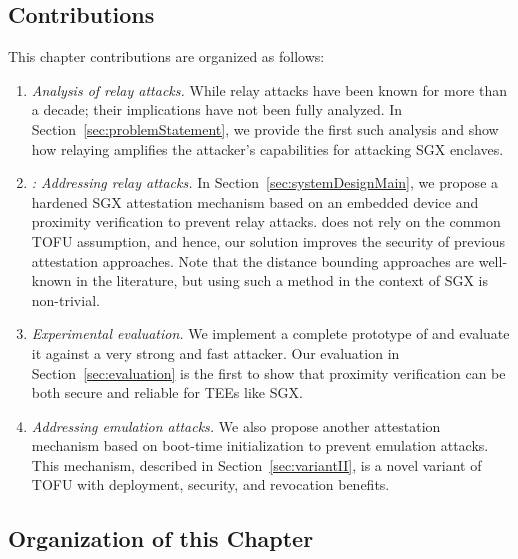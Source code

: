 \subsection{Contributions} This chapter contributions are organized as follows:

\begin{enumerate}
    \item \emph{Analysis of relay attacks.} While relay attacks have been known for more than a decade; their implications have not been fully analyzed. In Section~\ref{sec:problemStatement}, we provide the first such analysis and show how relaying amplifies the attacker's capabilities for attacking SGX enclaves.   

    \item \emph{\name: Addressing relay attacks.} In Section~\ref{sec:systemDesignMain}, we propose a hardened SGX attestation mechanism based on an embedded device and proximity verification to prevent relay attacks. \name does not rely on the common TOFU assumption, and hence, our solution improves the security of previous attestation approaches. Note that the distance bounding approaches are well-known in the literature, but using such a method in the context of SGX is non-trivial.
    
    \item \emph{Experimental evaluation.} We implement a complete prototype of \name and evaluate it against a very strong and fast attacker. Our evaluation in Section~\ref{sec:evaluation} is the first to show that proximity verification can be both secure and reliable for TEEs like SGX.
    
    \item \emph{Addressing emulation attacks.} We also propose another attestation mechanism based on boot-time initialization to prevent emulation attacks. This mechanism, described in Section~\ref{sec:variantII}, is a novel variant of TOFU with deployment, security, and revocation benefits.
\end{enumerate}

\subsection{Organization of this Chapter}

